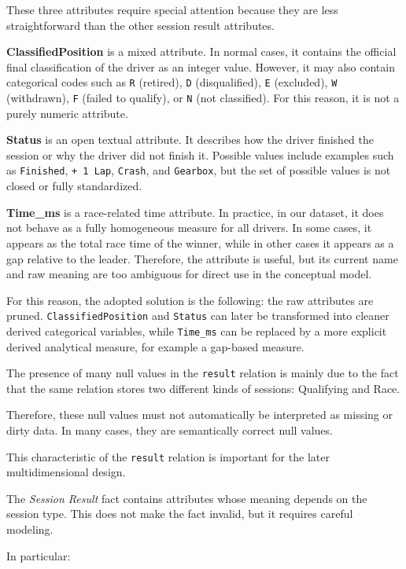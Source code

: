 \documentclass[a4paper,11pt]{article}
\begin{document}
	These three attributes require special attention because they are less straightforward than the other session result attributes.
	
	\textbf{ClassifiedPosition} is a mixed attribute. In normal cases, it contains the official final classification of the driver as an integer value. However, it may also contain categorical codes such as \texttt{R} (retired), \texttt{D} (disqualified), \texttt{E} (excluded), \texttt{W} (withdrawn), \texttt{F} (failed to qualify), or \texttt{N} (not classified). For this reason, it is not a purely numeric attribute.
	
	\textbf{Status} is an open textual attribute. It describes how the driver finished the session or why the driver did not finish it. Possible values include examples such as \texttt{Finished}, \texttt{+ 1 Lap}, \texttt{Crash}, and \texttt{Gearbox}, but the set of possible values is not closed or fully standardized.
	
	\textbf{Time\_ms} is a race-related time attribute. In practice, in our dataset, it does not behave as a fully homogeneous measure for all drivers. In some cases, it appears as the total race time of the winner, while in other cases it appears as a gap relative to the leader. Therefore, the attribute is useful, but its current name and raw meaning are too ambiguous for direct use in the conceptual model.
	
	For this reason, the adopted solution is the following: the raw attributes are pruned. \texttt{ClassifiedPosition} and \texttt{Status} can later be transformed into cleaner derived categorical variables, while \texttt{Time\_ms} can be replaced by a more explicit derived analytical measure, for example a gap-based measure.
	
	
	The presence of many null values in the \texttt{result} relation is mainly due to the fact
	that the same relation stores two different kinds of sessions: Qualifying and Race.
	

	Therefore, these null values must not automatically be interpreted as missing or dirty
	data. In many cases, they are semantically correct null values.
	
	This characteristic of the \texttt{result} relation is important for the later
	multidimensional design.
	
	The \textit{Session Result} fact contains attributes whose meaning depends on the session
	type. This does not make the fact invalid, but it requires careful modeling.
	
	In particular:
	
\end{document}
